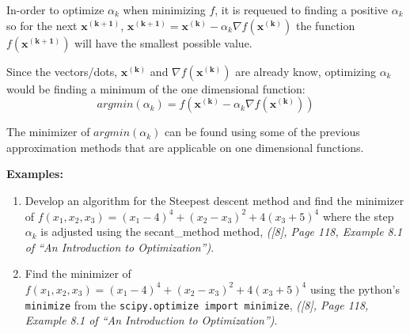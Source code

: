 \documentclass[11pt]{article}
\begin{document}
In-order to optimize \(\alpha_k\) when minimizing \(f\), it is requeued
to finding a positive \(\alpha_k\) so for the next \(\pmb{x^{(k+1)}}\),
\(\pmb{x^{(k+1)}} = \pmb{x^{(k)}} - \alpha_k \nabla f(\pmb{x^{(k)}})\)
the function \(f(\pmb{x^{(k+1)}})\) will have the smallest possible
value.

Since the vectors/dots, \(\pmb{x^{(k)}}\) and
\(\nabla f(\pmb{x^{(k)}})\) are already know, optimizing \(\alpha_k\)
would be finding a minimum of the one dimensional function:
\[argmin(\alpha_k) = f(\pmb{x^{(k)}} - \alpha_k \nabla f(\pmb{x^{(k)}}))\]

The minimizer of \(argmin(\alpha_k)\) can be found using some of the
previous approximation methods that are applicable on one dimensional
functions.

\textbf{Examples:}

\begin{enumerate}
\def\labelenumi{\arabic{enumi}.}
\item
  Develop an algorithm for the Steepest descent method and find the
  minimizer of
  \(f(x_1, x_2, x_3) = (x_1 - 4)^4 + (x_2 - x_3)^2 + 4(x_3 + 5)^4\)
  where the step \(\alpha_k\) is adjusted using the secant\_method
  method, \emph{({[}8{]}, Page 118, Example 8.1 of ``An Introduction to
  Optimization'')}.
\item
  Find the minimizer of
  \(f(x_1, x_2, x_3) = (x_1 - 4)^4 + (x_2 - x_3)^2 + 4(x_3 + 5)^4\)
  using the python's \texttt{minimize} from the
  \texttt{scipy.optimize\ import\ minimize}, \emph{({[}8{]}, Page 118,
  Example 8.1 of ``An Introduction to Optimization'')}.
\end{enumerate}
\end{document}
